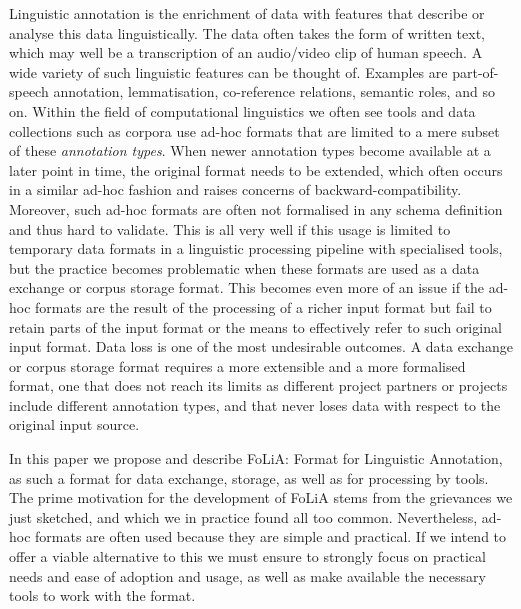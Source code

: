 \documentclass[a4paper,10pt,twoside]{article}
\begin{document}
Linguistic annotation is the enrichment of data with features that describe or
analyse this data linguistically. The data often takes the form of written
text, which may well be a transcription of an audio/video clip of human speech.
A wide variety of such linguistic features can be thought of. Examples are
part-of-speech annotation, lemmatisation, co-reference relations, semantic
roles, and so on. Within the field of computational linguistics we often see
tools and data collections such as corpora use ad-hoc formats that are limited
to a mere subset of these \emph{annotation types}. When newer annotation types
become available at a later point in time, the original format needs to be
extended, which often occurs in a similar ad-hoc fashion and raises concerns of
backward-compatibility. Moreover, such ad-hoc formats are often not formalised
in any schema definition and thus hard to validate. This is all very well if
this usage is limited to temporary data formats in a linguistic processing
pipeline with specialised tools, but the practice becomes problematic when
these formats are used as a data exchange or corpus storage format. This
becomes even more of an issue if the ad-hoc formats are the result of the
processing of a richer input format but fail to retain parts of the input
format or the means to effectively refer to such original input format.  Data
loss is one of the most undesirable outcomes. A data exchange or corpus storage
format requires a more extensible and a more formalised format, one that does
not reach its limits as different project partners or projects include
different annotation types, and that never loses data with respect to the
original input source.

In this paper we propose and describe FoLiA: Format for Linguistic Annotation,
as such a format for data exchange, storage, as well as for processing by
tools. The prime motivation for the development of FoLiA stems from the
grievances we just sketched, and which we in practice found all too common.
Nevertheless, ad-hoc formats are often used because they are simple and
practical. If we intend to offer a viable alternative to this we must ensure to
strongly focus on practical needs and ease of adoption and usage, as well as
make available the necessary tools to work with the format. 
\end{document}
